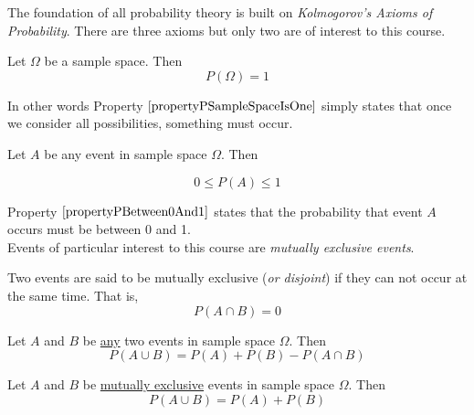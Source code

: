 The foundation of all probability theory is built on \textit{Kolmogorov's Axioms of Probability}. There are three axioms but only two are of interest to this course.


\begin{property}\label{propertyPSampleSpaceIsOne}
Let $\Omega$ be a sample space. Then
	\begin{equation}
	P(\Omega) = 1
	\end{equation}
\end{property}

\noindent
In other words Property $\ref{propertyPSampleSpaceIsOne}$
simply states that once we consider all possibilities, something must occur.

\begin{property}\label{propertyPBetween0And1}
Let $A$ be any event in sample space $\Omega$. Then
	\begin{center}
	\begin{equation}
	0 \leq P(A) \leq 1
	\end{equation}
	\end{center}
\end{property}

\noindent
Property $\ref{propertyPBetween0And1}$ states that
the probability that event $A$ occurs must be between 0 and 1.\\

\noindent
Events of particular interest to this course are \textit{mutually exclusive events}.

\begin{definition}	
Two events are said to be mutually exclusive (\textit{or disjoint}) if they can not occur at the same time. That is,
\[ P(A \cap B) = 0 \]
\end{definition}

\hfill
\begin{property}	
\justifying
Let $A$ and $B$ be \underline{any} two events in sample space $\Omega$. 
Then
	\begin{equation}
	P(A \cup B) = P(A) + P(B) - P(A \cap B)
	\end{equation}
\end{property}

\hfill
\begin{property}	
Let $A$ and $B$ be \underline{mutually exclusive} events in sample space $\Omega$. 
Then
	\begin{equation}
	P(A \cup B) = P(A) + P(B)
	\end{equation}
\end{property}


